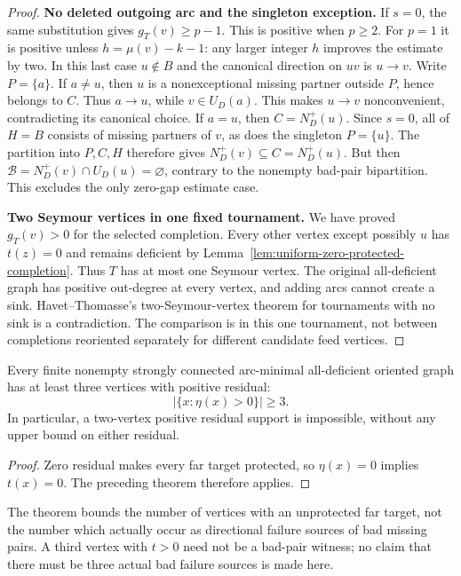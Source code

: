 \begin{proof}
\par\medskip\noindent\textbf{No deleted outgoing arc and the singleton exception.}\quad 
If $s=0$, the same substitution gives $g_T(v)\ge p-1$.
This is positive when $p\ge2$.
For $p=1$ it is positive unless
$h=\mu(v)-k-1$: any larger integer $h$ improves the estimate by two.
In this last case $u\notin B$ and the canonical direction on $uv$
is $u\to v$.
Write $P=\{a\}$.
If $a\ne u$, then $u$ is a nonexceptional missing partner outside
$P$, hence belongs to $C$. Thus $a\to u$, while $v\in U_D(a)$.
This makes $u\to v$ nonconvenient, contradicting its canonical choice.
If $a=u$, then $C=N_D^+(u)$. Since $s=0$, all of $H=B$ consists of
missing partners of $v$, as does the singleton $P=\{u\}$.
The partition into $P,C,H$ therefore gives
$N_D^+(v)\subseteq C=N_D^+(u)$.
But then
$\mathcal B=N_D^+(v)\cap U_D(u)=\varnothing$,
contrary to the nonempty bad-pair bipartition.
This excludes the only zero-gap estimate case.

\par\medskip\noindent\textbf{Two Seymour vertices in one fixed tournament.}\quad 
We have proved $g_T(v)>0$ for the selected completion.
Every other vertex except possibly $u$ has $t(z)=0$ and remains
deficient by Lemma~\ref{lem:uniform-zero-protected-completion}.
Thus $T$ has at most one Seymour vertex.
The original all-deficient graph has positive out-degree at every
vertex, and adding arcs cannot create a sink. Havet--Thomasse's
two-Seymour-vertex theorem for tournaments with no sink
\cite[Theorem~2]{HavetThomasse2000} is a contradiction.
The comparison is in this one tournament, not between completions
reoriented separately for different candidate feed vertices.
\end{proof}

\begin{corollary}\label{cor:three-positive-residual-support}
Every finite nonempty strongly connected arc-minimal all-deficient oriented graph has
at least three vertices with positive residual:
\[
 \bigl|\{x:\eta(x)>0\}\bigr|\ge3.
\]
In particular, a two-vertex positive residual support is impossible,
without any upper bound on either residual.
\end{corollary}
\begin{proof}
Zero residual makes every far target protected, so $\eta(x)=0$
implies $t(x)=0$. The preceding theorem therefore applies.
\end{proof}

\begin{remark}
The theorem bounds the number of vertices with an unprotected far
target, not the number which actually occur as directional failure
sources of bad missing pairs. A third vertex with $t>0$ need not be
a bad-pair witness; no claim that there must be three actual bad
failure sources is made here.
\end{remark}
